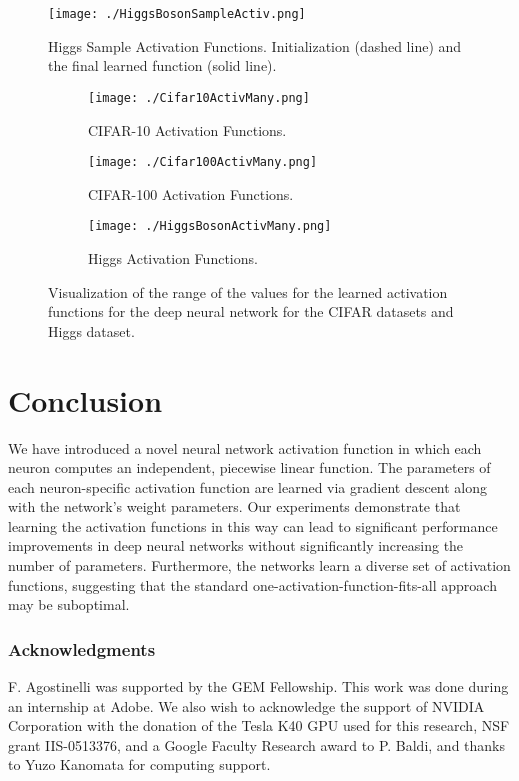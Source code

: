 \documentclass{article} \usepackage{iclr2015,times}
\begin{document}
\begin{figure}[h]
\center
\texttt{[image: ./HiggsBosonSampleActiv.png]}
\caption{Higgs Sample Activation Functions. Initialization (dashed line) and the final learned function (solid line).}
\label{fig:HiggsBosonSampleActivFunction}
\end{figure}








\begin{figure}[h]
\begin{subfigure}[h]{0.5\textwidth}
\center
\texttt{[image: ./Cifar10ActivMany.png]}
\caption{CIFAR-10 Activation Functions.}
\label{fig:Cifar10ActivFunction}
\end{subfigure}
\begin{subfigure}[h]{0.5\textwidth}
\center
\texttt{[image: ./Cifar100ActivMany.png]}
\caption{CIFAR-100 Activation Functions.}
\label{fig:Cifar100ActivFunction}
\end{subfigure}
\begin{subfigure}[h]{0.5\textwidth}
\center
\texttt{[image: ./HiggsBosonActivMany.png]}
\caption{Higgs Activation Functions.}
\label{fig:HiggsBosonActivFunction}
\end{subfigure}
\caption{Visualization of the range of the values for the learned activation functions for the deep neural network for the CIFAR datasets and Higgs dataset.}
\label{fig:activfunction}
\end{figure}





 
\section{Conclusion}
We have introduced a novel neural network activation function in which each neuron computes an independent, piecewise linear function. The parameters of each neuron-specific activation function are learned via gradient descent along with the network's weight parameters. Our experiments demonstrate that learning the activation functions in this way can lead to significant performance improvements in deep neural networks without significantly increasing the number of parameters. Furthermore, the networks learn a diverse set of activation functions, suggesting that the standard one-activation-function-fits-all approach may be suboptimal. 

\subsubsection*{Acknowledgments}
F. Agostinelli was supported by the GEM Fellowship. This work was done during an internship at Adobe. We also wish to acknowledge the support of NVIDIA Corporation with the donation of the Tesla K40 GPU used for this research, NSF grant IIS-0513376, and a Google Faculty Research award to P. Baldi, and thanks to Yuzo Kanomata for computing support.
 


\end{document}
